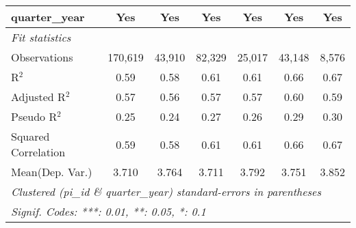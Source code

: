 \begin{tabular}{lcccccc}
   quarter\_year                                              & Yes           & Yes           & Yes           & Yes           & Yes          & Yes\\  
   \midrule
   \emph{Fit statistics}\\
   Observations                                               & 170,619       & 43,910        & 82,329        & 25,017        & 43,148       & 8,576\\  
   R$^2$                                                      & 0.59          & 0.58          & 0.61          & 0.61          & 0.66         & 0.67\\  
   Adjusted R$^2$                                             & 0.57          & 0.56          & 0.57          & 0.57          & 0.60         & 0.59\\  
   Pseudo R$^2$                                               & 0.25          & 0.24          & 0.27          & 0.26          & 0.29         & 0.30\\  
   Squared Correlation                                        & 0.59          & 0.58          & 0.61          & 0.61          & 0.66         & 0.67\\  
Mean(Dep. Var.) & 3.710 & 3.764 & 3.711 & 3.792 & 3.751 & 3.852 \\
   \midrule \midrule
   \multicolumn{7}{l}{\emph{Clustered (pi\_id \& quarter\_year) standard-errors in parentheses}}\\
   \multicolumn{7}{l}{\emph{Signif. Codes: ***: 0.01, **: 0.05, *: 0.1}}\\
\end{tabular}
\par\endgroup

